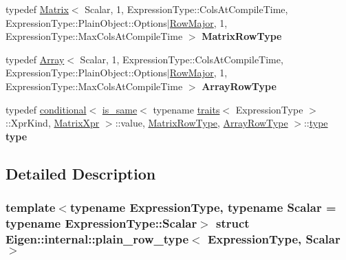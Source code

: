 \begin{DoxyCompactItemize}
\item 
\mbox{\label{struct_eigen_1_1internal_1_1plain__row__type_a499e20b59c8b2a229039780dc9fb6ced}} 
typedef \hyperlink{group___core___module_class_eigen_1_1_matrix}{Matrix}$<$ Scalar, 1, Expression\+Type\+::\+Cols\+At\+Compile\+Time, Expression\+Type\+::\+Plain\+Object\+::\+Options$\vert$\hyperlink{group__enums_ggaacded1a18ae58b0f554751f6cdf9eb13acfcde9cd8677c5f7caf6bd603666aae3}{Row\+Major}, 1, Expression\+Type\+::\+Max\+Cols\+At\+Compile\+Time $>$ {\bfseries Matrix\+Row\+Type}
\item 
\mbox{\label{struct_eigen_1_1internal_1_1plain__row__type_abff896fa5a71cc838b47e38bd58bb561}} 
typedef \hyperlink{group___core___module_class_eigen_1_1_array}{Array}$<$ Scalar, 1, Expression\+Type\+::\+Cols\+At\+Compile\+Time, Expression\+Type\+::\+Plain\+Object\+::\+Options$\vert$\hyperlink{group__enums_ggaacded1a18ae58b0f554751f6cdf9eb13acfcde9cd8677c5f7caf6bd603666aae3}{Row\+Major}, 1, Expression\+Type\+::\+Max\+Cols\+At\+Compile\+Time $>$ {\bfseries Array\+Row\+Type}
\item 
\mbox{\label{struct_eigen_1_1internal_1_1plain__row__type_afd854af5b54f4843ccb5d712fcadd462}} 
typedef \hyperlink{struct_eigen_1_1internal_1_1conditional}{conditional}$<$ \hyperlink{struct_eigen_1_1internal_1_1is__same}{is\+\_\+same}$<$ typename \hyperlink{struct_eigen_1_1internal_1_1traits}{traits}$<$ Expression\+Type $>$\+::Xpr\+Kind, \hyperlink{struct_eigen_1_1_matrix_xpr}{Matrix\+Xpr} $>$\+::value, \hyperlink{group___core___module_class_eigen_1_1_matrix}{Matrix\+Row\+Type}, \hyperlink{group___core___module_class_eigen_1_1_array}{Array\+Row\+Type} $>$\+::\hyperlink{class_eigen_1_1internal_1_1_tensor_lazy_evaluator_writable}{type} {\bfseries type}
\end{DoxyCompactItemize}


\subsection{Detailed Description}
\subsubsection*{template$<$typename Expression\+Type, typename Scalar = typename Expression\+Type\+::\+Scalar$>$\newline
struct Eigen\+::internal\+::plain\+\_\+row\+\_\+type$<$ Expression\+Type, Scalar $>$}



